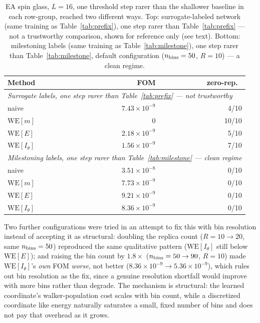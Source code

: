 \documentclass[a4paper,fleqn]{cas-sc}
\begin{document}
\begin{table}[H]
\centering\small
\caption{EA spin glass, $L=16$, one threshold step rarer than the shallower baseline in
	each row-group, reached two different ways. Top: surrogate-labeled network (same
	training as Table~\ref{tab:prefix}), one step rarer than Table~\ref{tab:prefix} --- not
	a trustworthy comparison, shown for reference only (see text). Bottom: milestoning
	labels (same training as Table~\ref{tab:milestone}), one step rarer than
	Table~\ref{tab:milestone}, default configuration ($n_{\rm bins}=50$, $R=10$) --- a
	clean regime.}
\label{tab:beyond2}
\label{tab:milestone2}
\begin{tabular}{lrr}
	\toprule
	Method & FOM & zero-rep.\ \\
	\midrule
	\multicolumn{3}{l}{\emph{Surrogate labels, one step rarer than Table~\ref{tab:prefix} --- not trustworthy}} \\
	naive & $7.43\times10^{-9}$ & 4/10 \\
	$\mathrm{WE}[m]$ & $0$ & 10/10 \\
	$\mathrm{WE}[E]$ & $2.18\times10^{-9}$ & 5/10 \\
	$\mathrm{WE}[I_\theta]$ & $1.56\times10^{-9}$ & 7/10 \\
	\multicolumn{3}{l}{\emph{Milestoning labels, one step rarer than Table~\ref{tab:milestone} --- clean regime}} \\
	naive & $3.51\times10^{-8}$ & 0/10 \\
	$\mathrm{WE}[m]$ & $7.73\times10^{-9}$ & 0/10 \\
	$\mathrm{WE}[E]$ & $9.21\times10^{-9}$ & 0/10 \\
	$\mathrm{WE}[I_\theta]$ & $8.36\times10^{-9}$ & 0/10 \\
	\bottomrule
\end{tabular}
\end{table}

Two further configurations were tried in an attempt to fix this with bin resolution instead
of accepting it as structural: doubling the replica count ($R=10\to20$, same $n_{\rm
	bins}=50$) reproduced the same qualitative pattern ($\mathrm{WE}[I_\theta]$ still below
$\mathrm{WE}[E]$); and raising the bin count by $1.8\times$ ($n_{\rm bins}=50\to90$, $R=10$)
made $\mathrm{WE}[I_\theta]$'s \emph{own} FOM \emph{worse}, not better
($8.36\times10^{-9}\to5.36\times10^{-9}$), which rules out bin resolution as the fix, since
a genuine resolution shortfall would improve with more bins rather than degrade. The
mechanism is structural: the learned coordinate's walker-population cost scales with bin
count, while a discretized coordinate like energy naturally saturates a small, fixed
number of bins and does not pay that overhead as it grows.
\end{document}
